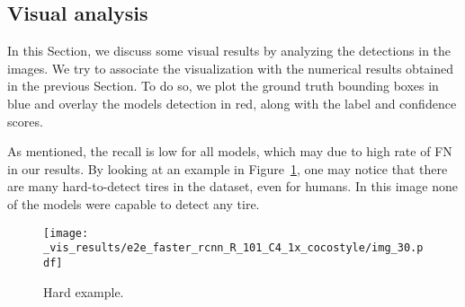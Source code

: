 


\newpage
\subsection{Visual analysis}\label{sec:res_vis}
%
In this Section, we discuss some visual results by analyzing the detections in the images.
We try to associate the visualization with the numerical results obtained in the previous Section.
To do so, we plot the ground truth bounding boxes in blue and overlay the models detection in red, along with the label and confidence scores.

As mentioned, the recall is low for all models, which may due to high rate of FN in our results.
By looking at an example in Figure~\ref{fig:hard}, one may notice that there are many hard-to-detect tires in the dataset, even for humans.
In this image none of the models were capable to detect any tire.
%
\begin{figure}[h!]
	\centering
	\texttt{[image: \_vis\_results/e2e\_faster\_rcnn\_R\_101\_C4\_1x\_cocostyle/img\_30.pdf]}
	\caption{Hard example.}
	\label{fig:hard}
\end{figure}


